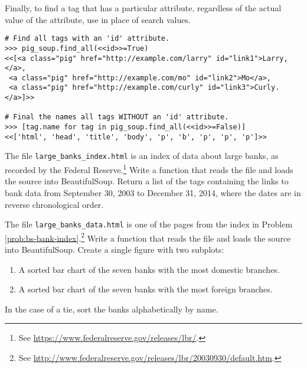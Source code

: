Finally, to find a tag that has a particular attribute, regardless of the actual value of the attribute, use  in place of search values.

\begin{lstlisting}
# Find all tags with an 'id' attribute.
>>> pig_soup.find_all(<<id>>=True)
<<[<a class="pig" href="http://example.com/larry" id="link1">Larry,</a>,
 <a class="pig" href="http://example.com/mo" id="link2">Mo</a>,
 <a class="pig" href="http://example.com/curly" id="link3">Curly.</a>]>>

# Final the names all tags WITHOUT an 'id' attribute.
>>> [tag.name for tag in pig_soup.find_all(<<id>>=False)]
<<['html', 'head', 'title', 'body', 'p', 'b', 'p', 'p', 'p']>>
\end{lstlisting}

\begin{problem} %
The file \texttt{large\_banks\_index.html} is an index of data about large banks, as recorded by the Federal Reserve.\footnote{See \url{https://www.federalreserve.gov/releases/lbr/}.}
Write a function that reads the file and loads the source into BeautifulSoup.
Return a list of the tags containing the links to bank data from September 30, 2003 to December 31, 2014, where the dates are in reverse chronological order.
\label{prob:bs-bank-index}
\end{problem}

\begin{problem} %
The file \texttt{large\_banks\_data.html} is one of the pages from the index in Problem \ref{prob:bs-bank-index}.\footnote{See \url{http://www.federalreserve.gov/releases/lbr/20030930/default.htm}.}
Write a function that reads the file and loads the source into BeautifulSoup.
Create a single figure with two subplots:
\begin{enumerate}
    \item A sorted bar chart of the seven banks with the most domestic branches.
    \item A sorted bar chart of the seven banks with the most foreign branches.
\end{enumerate}
In the case of a tie, sort the banks alphabetically by name.
\end{problem}
